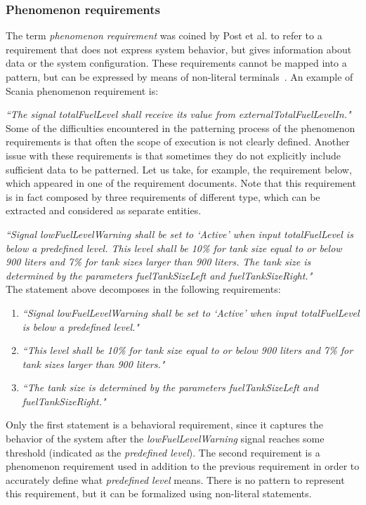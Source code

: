 \documentclass[conference]{IEEEtran}
\begin{document}
\subsubsection*{\textbf{ Phenomenon requirements}}
The term \emph{phenomenon requirement} was coined by Post et al. to refer to a requirement that does not express system behavior, but gives information about data or the system configuration. These requirements cannot be mapped into a pattern, but can be expressed by means of non-literal terminals~\cite{Post12bosch}. 
An example of Scania phenomenon requirement is:

\textit{``The signal totalFuelLevel shall receive its value from externalTotalFuelLevelIn."}\\

Some of the difficulties encountered in the patterning process of the phenomenon requirements is that often the scope of execution is not clearly defined. 
Another issue with these requirements is that sometimes they do not explicitly include sufficient data to be patterned. Let us take, for example, the requirement below, which appeared in one of the requirement documents. Note that this requirement is in fact composed by three requirements of different type, which can be extracted and considered as separate entities.

\textit{``Signal lowFuelLevelWarning shall be set to ‘Active’ when input totalFuelLevel is below a predefined level. This level shall be 10\% for tank size equal to or below 900 liters and 7\% for tank sizes larger than 900 liters. The tank size is determined by the parameters fuelTankSizeLeft and fuelTankSizeRight."}\\

The statement above decomposes in the following requirements:
\begin{enumerate}
\item \textit{``Signal lowFuelLevelWarning shall be set to ‘Active’ when input totalFuelLevel is below a predefined level."}
\item \textit{``This level shall be 10\% for tank size equal to or below 900 liters and 7\% for tank sizes larger than 900 liters."}
\item \textit{``The tank size is determined by the parameters fuelTankSizeLeft and fuelTankSizeRight."}\\
\end{enumerate}

Only the first statement is a behavioral requirement, since it captures the behavior of the system after the \textit{lowFuelLevelWarning} signal reaches some threshold (indicated as the \textit{predefined level}). The second requirement is a phenomenon requirement used in addition to the previous requirement in order to accurately define what \textit{predefined level} means. There is no pattern to represent this requirement, but it can be formalized using non-literal statements.
\end{document}
